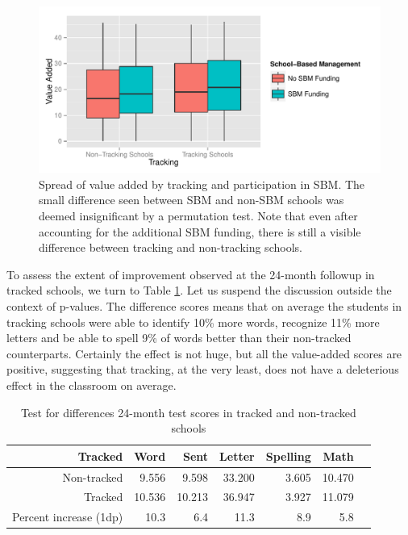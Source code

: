 \documentclass[11pt]{article}
\begin{document}
  \begin{figure}[H]
  	\centering
  	\includegraphics[scale=0.8]{../Figures/ValueAddedTrackSBM.pdf}
  	\caption{Spread of value added by tracking and participation in SBM. The small difference seen between SBM and non-SBM schools was deemed insignificant by a permutation test.  Note that even after accounting for the additional SBM funding, there is still a visible difference between tracking and non-tracking schools.}
  	\label{fig:ValueAddedTrackSBM}
  \end{figure} 

To assess the extent of improvement observed at the 24-month followup in tracked schools, we turn to Table \ref{tab:practical}. Let us suspend the discussion outside the context of p-values. The difference scores means that on average the students in tracking schools were able to identify 10\% more words, recognize 11\% more letters and be able to spell 9\% of words better than their non-tracked counterparts. Certainly the effect is not huge, but all the value-added scores are positive, suggesting that tracking, at the very least, does not have a deleterious effect in the classroom on average.

\begin{table}[ht]
	\centering
	\begin{tabular}{rrrrrrr}
		\hline
		Tracked & Word & Sent & Letter & Spelling & Math \\ 
		\hline
		 Non-tracked & 9.556 & 9.598 & 33.200 & 3.605 & 10.470 \\ 
		 Tracked & 10.536 & 10.213 & 36.947 & 3.927 & 11.079 \\ 
		\hline
		Percent increase (1dp) & 10.3 & 6.4 & 11.3 & 8.9 & 5.8\\
		\hline
	\end{tabular}
	\caption{Test for differences 24-month test scores in tracked and non-tracked schools} 
	\label{tab:practical}
\end{table}
\end{document}
